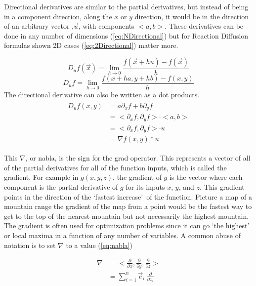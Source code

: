 \documentclass[12pt, letterpaper]{article}
\newcommand{\sorta}[1]{\lq #1\rq \,}
\begin{document}
Directional derivatives are similar to the partial derivatives, but instead of being in 
a component direction, along the $x$ or $y$ direction, it would be in the direction of an arbitrary vector
,$\vec{u}$, with components $ <a, b> $. These derivatives can be done in any number of dimensions 
(\ref{eq:NDirectional}) but for Reaction Diffusion formulas shown 2D cases (\ref{eq:2Directional}) matter
more.

\begin{equation}
  D_u{f(\vec{x})} = \lim_{h \to 0} \frac{f(\vec{x} + hu) − f(\vec{x})}{h}
  \label{eq:NDirectional}
\end{equation}
\begin{equation}
  D_u f = \lim_{h \to 0} \frac{f(x + ha, y+ hb) − f(x, y)}{h}
  \label{eq:2Directional}
\end{equation}
The directional derivative can also be written as a dot products.
\begin{gather*}
\begin{aligned}
  D_u f(x,y) &= a\partial_x f + b\partial_y f \\
             &= <\partial_x f, \partial_y f> \cdot <a, b> \\
             &= <\partial_x f, \partial_y f> \cdot u \\
             &= \nabla f(x,y) * u 
\end{aligned}
\end{gather*}

This $\nabla$, or nabla, is the sign for the grad operator. This represents a vector of all
of the partial derivatives for all of the function inputs, which is called the gradient. For example in $g(x,
y, z)$, the gradient of $g$ is the vector where each component is the partial derivative of $g$ for its
inputs $x$, $y$, and $z$. This gradient points in the direction of the \sorta{fastest increase} of the
function. Picture a map of a mountain range the gradient of the map from a point would be the fastest
way to get to the top of the nearest mountain but not necessarily the highest mountain. The gradient is often
used for optimization problems since it can go \sorta{the highest} or local maxima in a function of any
number of variables. A common abuse of notation is to set $\nabla$ to a value (\ref{eq:nabla})

\begin{equation}
  \begin{aligned}
    \nabla &= <\frac{\partial}{\partial x}, \frac{\partial}{\partial y}, \frac{\partial}{\partial z}> \\
           &= \sum_{i=1}^{n} \vec{e}_{i} \: \frac{\partial}{\partial x_i}
  \end{aligned}
  \label{eq:nabla}
\end{equation}
\end{document}
